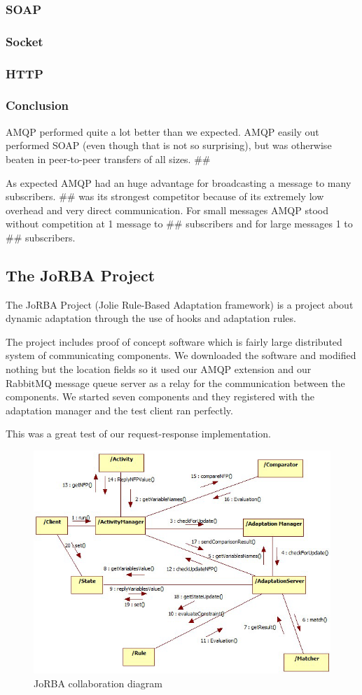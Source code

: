 \subsubsection{SOAP}

\subsubsection{Socket}

\subsubsection{HTTP}

\subsubsection{Conclusion}
AMQP performed quite a lot better than we expected. AMQP easily out performed SOAP (even though that is not so surprising), but was otherwise beaten in peer-to-peer transfers of all sizes. \#\#

As expected AMQP had an huge advantage for broadcasting a message to many subscribers. \#\# was its strongest competitor because of its extremely low overhead and very direct communication. For small messages AMQP stood without competition at 1 message to \#\# subscribers and for large messages 1 to \#\# subscribers.
\subsection{The JoRBA Project}
\label{subsec:The JoRBA Project}
The JoRBA Project\cite{Jorba} (Jolie Rule-Based Adaptation framework) is a project about dynamic adaptation through the use of hooks and adaptation rules.

The project includes proof of concept software which is fairly large distributed system of communicating components. We downloaded the software and modified nothing but the location fields so it used our AMQP extension and our RabbitMQ message queue server as a relay for the communication between the components. We started seven components and they registered with the adaptation manager and the test client ran perfectly.

This was a great test of our request-response implementation.
\begin{figure}[H]
  \includegraphics[width=\textwidth]{illustrations/Jorba.png}
  \caption{JoRBA collaboration diagram}
\end{figure}
\newpage